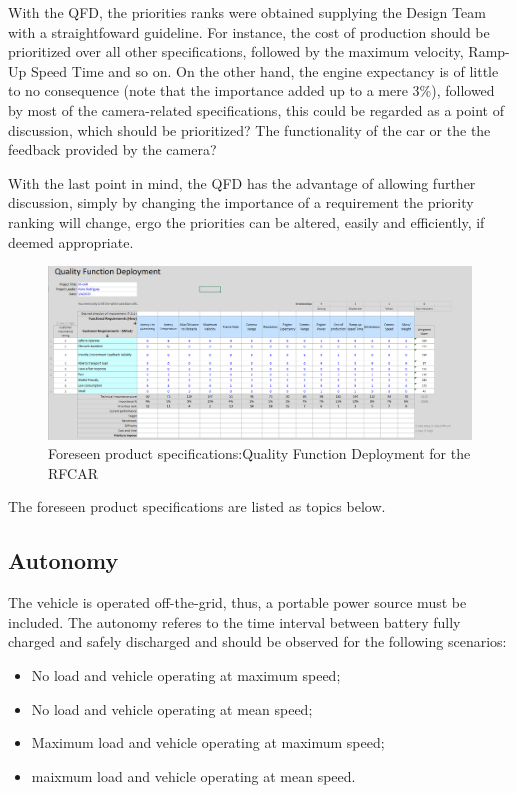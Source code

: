 With the QFD, the priorities ranks were obtained supplying the Design Team with a
straightfoward guideline. For instance, the cost of production should be
prioritized over all other specifications, followed by the maximum velocity,
Ramp-Up Speed Time and so on.  On the other hand, the engine expectancy is of
little to no consequence (note that the importance added up to a mere 3\%),
followed by most of the camera-related specifications, this could be regarded as
a point of discussion, which should be prioritized? The functionality of the car
or the the feedback provided by the camera?

With the last point in mind, the QFD has the advantage of allowing further
discussion, simply by changing the importance of a requirement the priority ranking will change, ergo
the priorities can be altered, easily and efficiently, if deemed appropriate.
%
\begin{figure}
\centering
\includegraphics[width=1.25\textwidth]{./sec/img/QFD_Initial.png}
\caption{\label{fig:QFD}Foreseen product specifications:Quality Function Deployment for the RFCAR}
\end{figure}
\newpage
The foreseen product specifications are listed as topics below.

\subsection{Autonomy}%
\label{sec:autonomy-specs}
The vehicle is operated off-the-grid, thus, a portable power source must be included. The autonomy referes to the time interval between battery fully charged and safely discharged and should be observed for the following scenarios:
\begin{itemize}
\item No load and vehicle operating at maximum speed;
\item No load and vehicle operating at mean speed;
\item Maximum load and vehicle operating at maximum speed;
\item maixmum load and vehicle operating at mean speed.
\end{itemize}
